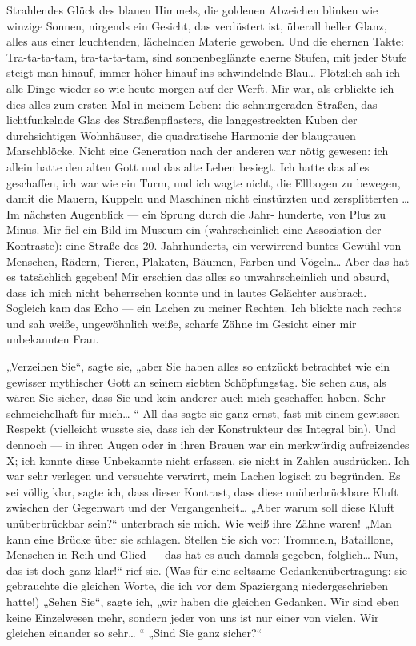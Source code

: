 Strahlendes Glück des blauen Himmels, die goldenen Abzeichen
blinken wie winzige Sonnen, nirgends ein Gesicht, das verdüstert
ist, überall heller Glanz, alles aus einer leuchtenden, lächelnden
Materie gewoben. Und die ehernen Takte: Tra-ta-ta-tam,
tra-ta-ta-tam, sind sonnenbeglänzte eherne Stufen, mit jeder Stufe
steigt man hinauf, immer höher hinauf ins schwindelnde Blau\ldots{}
Plötzlich sah ich alle Dinge wieder so wie heute morgen auf der
Werft. Mir war, als erblickte ich dies alles zum ersten Mal in
meinem Leben: die schnurgeraden Straßen, das lichtfunkelnde Glas
des Straßenpflasters, die langgestreckten Kuben der durchsichtigen
Wohnhäuser, die quadratische Harmonie der blaugrauen Marschblöcke.
Nicht eine Generation nach der anderen war nötig gewesen: ich
allein hatte den alten Gott und das alte Leben besiegt. Ich hatte
das alles geschaffen, ich war wie ein Turm, und ich wagte nicht,
die Ellbogen zu bewegen, damit die Mauern, Kuppeln und Maschinen
nicht einstürzten und zersplitterten \ldots{} Im nächsten Augenblick —
ein Sprung durch die Jahr-
hunderte, von Plus zu Minus. Mir fiel ein Bild im Museum ein
(wahrscheinlich eine Assoziation der Kontraste): eine Straße des
20. Jahrhunderts, ein verwirrend buntes Gewühl von Menschen,
Rädern, Tieren, Plakaten, Bäumen, Farben und Vögeln\ldots{} Aber das hat
es tatsächlich gegeben! Mir erschien das alles so unwahrscheinlich
und absurd, dass ich mich nicht beherrschen konnte und in lautes
Gelächter ausbrach. Sogleich kam das Echo — ein Lachen zu meiner
Rechten. Ich blickte nach rechts und sah weiße, ungewöhnlich weiße,
scharfe Zähne im Gesicht einer mir unbekannten Frau.

„Verzeihen Sie“, sagte sie, „aber Sie haben alles so entzückt
betrachtet wie ein gewisser mythischer Gott an seinem siebten
Schöpfungstag. Sie sehen aus, als wären Sie sicher, dass Sie und
kein anderer auch mich geschaffen haben. Sehr schmeichelhaft für
mich\ldots{} “ All das sagte sie ganz ernst, fast mit einem gewissen
Respekt (vielleicht wusste sie, dass ich der Konstrukteur des
Integral bin). Und dennoch — in ihren Augen oder in ihren Brauen
war ein merkwürdig aufreizendes X; ich konnte diese Unbekannte
nicht erfassen, sie nicht in Zahlen ausdrücken. Ich war sehr
verlegen und versuchte verwirrt, mein Lachen logisch zu begründen.
Es sei völlig klar, sagte ich, dass dieser Kontrast, dass diese
unüberbrückbare Kluft zwischen der Gegenwart und der
Vergangenheit\ldots{} „Aber warum soll diese Kluft unüberbrückbar sein?“
unterbrach sie mich. Wie weiß ihre Zähne waren! „Man kann eine
Brücke über sie schlagen. Stellen Sie sich vor: Trommeln,
Bataillone, Menschen in Reih und Glied — das hat es auch damals
gegeben, folglich\ldots{} Nun, das ist doch ganz klar!“ rief sie. (Was
für eine seltsame Gedankenübertragung: sie gebrauchte die gleichen
Worte, die ich vor dem Spaziergang niedergeschrieben
hatte!) „Sehen Sie“, sagte ich, „wir haben die gleichen Gedanken.
Wir sind eben keine Einzelwesen mehr, sondern jeder von uns ist nur
einer von vielen. Wir gleichen einander so sehr\ldots{} “ „Sind Sie ganz
sicher?“

